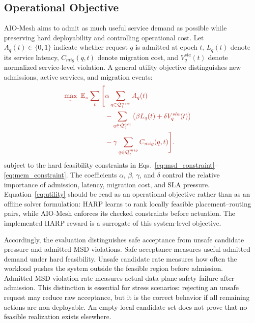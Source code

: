 \documentclass[final,5p]{elsarticle}
\newcommand{\rev}[1]{\textcolor{BrickRed}{#1}}
\begin{document}
\subsection{Operational Objective}
\label{subsec:objective_metrics}

AIO-Mesh aims to admit as much useful service demand as possible while preserving hard deployability and controlling operational cost. Let \(A_q(t)\in\{0,1\}\) indicate whether request \(q\) is admitted at epoch \(t\), \(L_q(t)\) denote its service latency, \(C_{mig}(q,t)\) denote migration cost, and \(V_q^{sla}(t)\) denote normalized service-level violation. \rev{A general utility objective distinguishes new admissions, active services, and migration events:}
\begin{equation}
\rev{\begin{aligned}
\max_{\pi}\ \mathbb{E}_{\pi}\sum_t\Bigg[
&\alpha\sum_{q\in\mathcal{Q}_t^{new}}A_q(t)\\
&-\sum_{q\in\mathcal{Q}_t^{act}}\big(\beta L_q(t)+\delta V_q^{sla}(t)\big)\\
&-\gamma\sum_{q\in\mathcal{Q}_t^{mig}}C_{mig}(q,t)
\Bigg].
\end{aligned}}
\label{eq:utility}
\end{equation}
subject to the hard feasibility constraints in Eqs.~\eqref{eq:msd_constraint}--\eqref{eq:mem_constraint}. The coefficients \(\alpha\), \(\beta\), \(\gamma\), and \(\delta\) control the relative importance of admission, latency, migration cost, and SLA pressure. Equation~\eqref{eq:utility} should be read as an operational objective rather than as an offline solver formulation: HARP learns to rank \rev{locally feasible placement--routing pairs}, while AIO-Mesh enforces \rev{its checked constraints} before actuation. \rev{The implemented HARP reward is a surrogate of this system-level objective.}

Accordingly, the evaluation distinguishes safe acceptance from unsafe candidate pressure and admitted MSD violations. Safe acceptance measures useful admitted demand under hard feasibility. Unsafe candidate rate measures how often the workload pushes the system outside the feasible region before admission. Admitted MSD violation rate measures actual data-plane safety failure after admission. This distinction is essential for stress scenarios: rejecting an unsafe request may reduce raw acceptance, but it is the correct behavior if all remaining actions are non-deployable. \rev{An empty local candidate set does not prove that no feasible realization exists elsewhere.}
\end{document}
